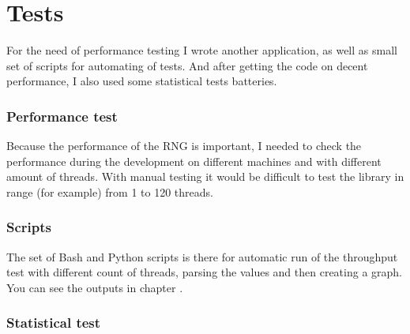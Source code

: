 
\chapter{Tests} \label{chap:tests}
For the need of performance testing I wrote another application, as well as small set of scripts for automating of tests. And after getting the code on decent performance, I also used some statistical tests batteries.

\subsection{Performance test}
Because the performance of the RNG is important, I needed to check the performance during the development on different machines and with different amount of threads. With manual testing it would be difficult to test the library in range (for example) from 1 to 120 threads.

\subsection{Scripts}
The set of Bash and Python scripts is there for automatic run of the throughput test with different count of threads, parsing the values and then creating a graph. You can see the outputs in chapter .

\subsection{Statistical test}


